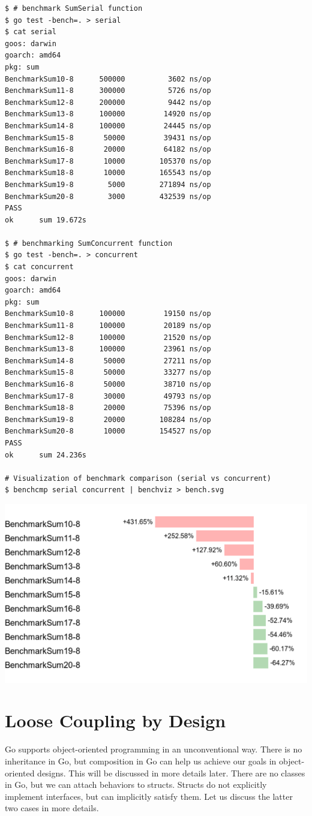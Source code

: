\documentclass[11pt]{article}
\begin{document}
\begin{verbatim}
$ # benchmark SumSerial function
$ go test -bench=. > serial
$ cat serial
goos: darwin
goarch: amd64
pkg: sum
BenchmarkSum10-8      500000          3602 ns/op
BenchmarkSum11-8      300000          5726 ns/op
BenchmarkSum12-8      200000          9442 ns/op
BenchmarkSum13-8      100000         14920 ns/op
BenchmarkSum14-8      100000         24445 ns/op
BenchmarkSum15-8       50000         39431 ns/op
BenchmarkSum16-8       20000         64182 ns/op
BenchmarkSum17-8       10000        105370 ns/op
BenchmarkSum18-8       10000        165543 ns/op
BenchmarkSum19-8        5000        271894 ns/op
BenchmarkSum20-8        3000        432539 ns/op
PASS
ok      sum 19.672s

$ # benchmarking SumConcurrent function
$ go test -bench=. > concurrent
$ cat concurrent
goos: darwin
goarch: amd64
pkg: sum
BenchmarkSum10-8      100000         19150 ns/op
BenchmarkSum11-8      100000         20189 ns/op
BenchmarkSum12-8      100000         21520 ns/op
BenchmarkSum13-8      100000         23961 ns/op
BenchmarkSum14-8       50000         27211 ns/op
BenchmarkSum15-8       50000         33277 ns/op
BenchmarkSum16-8       50000         38710 ns/op
BenchmarkSum17-8       30000         49793 ns/op
BenchmarkSum18-8       20000         75396 ns/op
BenchmarkSum19-8       20000        108284 ns/op
BenchmarkSum20-8       10000        154527 ns/op
PASS
ok      sum 24.236s

# Visualization of benchmark comparison (serial vs concurrent)
$ benchcmp serial concurrent | benchviz > bench.svg
\end{verbatim}

\includegraphics[width=.9\linewidth]{./code/src/sum/bench1.png}

\section*{Loose Coupling by Design}
\label{sec:orgheadline9}
Go supports object-oriented programming in an unconventional way. There is no inheritance in Go, but composition in Go can help us achieve our goals in object-oriented designs. This will be discussed in more details later. There are no classes in Go, but we can attach behaviors to structs. Structs do not explicitly implement interfaces, but can implicitly satisfy them. Let us discuss the latter two cases in more details.
\end{document}
